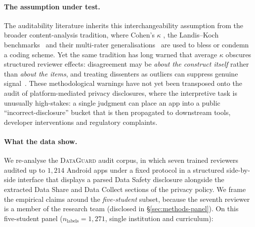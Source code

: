 \documentclass[11pt,a4paper]{article}
\newcommand{\dataguard}{\textsc{DataGuard}}
\begin{document}
\paragraph{The assumption under test.}
The auditability literature inherits this interchangeability assumption
from the broader content-analysis tradition, where Cohen's $\kappa$
\citep{cohen1960coefficient}, the Landis--Koch
benchmarks~\citep{landis1977measurement} and their multi-rater
generalisations~\citep{fleiss1971measuring,artstein2008intercoder} are
used to bless or condemn a coding scheme. Yet the same tradition has
long warned that average $\kappa$ obscures structured reviewer effects:
disagreement may be \emph{about the construct itself} rather than
\emph{about the items}, and treating dissenters as outliers can suppress
genuine signal~\citep{aroyo2015truth,plank2022problem}. These
methodological warnings have not yet been transposed onto the audit
of platform-mediated privacy disclosures, where the interpretive task
is unusually high-stakes: a single judgment can place an app into a
public ``incorrect-disclosure'' bucket that is then propagated to
downstream tools, developer interventions and regulatory complaints.

\paragraph{What the data show.}
We re-analyse the \dataguard{} audit corpus, in which seven trained
reviewers audited up to $1{,}214$ Android apps under a fixed protocol
in a structured side-by-side interface that displays a parsed Data
Safety disclosure alongside the extracted Data Share and Data Collect
sections of the privacy policy. We frame the empirical claims around
the \emph{five-student} subset, because the seventh reviewer is a
member of the research team (disclosed in
\S\ref{sec:methods-panel}). On this five-student panel
($n_{\text{labels}}=1{,}271$, single institution and curriculum):
\end{document}

